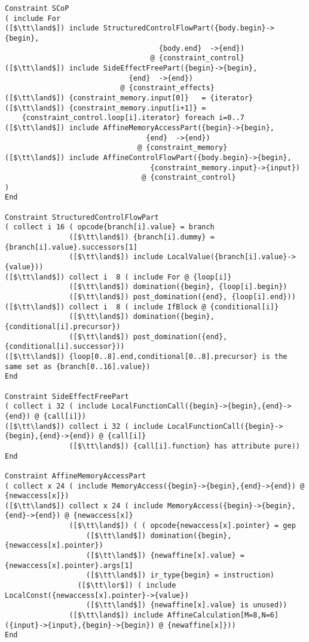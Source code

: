 \begin{lstlisting}[language=CAnDL]
Constraint SCoP
( include For
([$\tt\land$]) include StructuredControlFlowPart({body.begin}->{begin},
                                    {body.end}  ->{end})
                                  @ {constraint_control}
([$\tt\land$]) include SideEffectFreePart({begin}->{begin},
                             {end}  ->{end})
                           @ {constraint_effects}
([$\tt\land$]) {constraint_memory.input[0]}   = {iterator}
([$\tt\land$]) {constraint_memory.input[i+1]} =
    {constraint_control.loop[i].iterator} foreach i=0..7
([$\tt\land$]) include AffineMemoryAccessPart({begin}->{begin},
                                 {end}  ->{end})
                               @ {constraint_memory}
([$\tt\land$]) include AffineControlFlowPart({body.begin}->{begin},
                                  {constraint_memory.input}->{input})
                                @ {constraint_control}
)
End

Constraint StructuredControlFlowPart
( collect i 16 ( opcode{branch[i].value} = branch
               ([$\tt\land$]) {branch[i].dummy} = {branch[i].value}.successors[1]
               ([$\tt\land$]) include LocalValue({branch[i].value}->{value}))
([$\tt\land$]) collect i  8 ( include For @ {loop[i]}
               ([$\tt\land$]) domination({begin}, {loop[i].begin})
               ([$\tt\land$]) post_domination({end}, {loop[i].end}))
([$\tt\land$]) collect i  8 ( include IfBlock @ {conditional[i]}
               ([$\tt\land$]) domination({begin}, {conditional[i].precursor})
               ([$\tt\land$]) post_domination({end}, {conditional[i].successor}))
([$\tt\land$]) {loop[0..8].end,conditional[0..8].precursor} is the same set as {branch[0..16].value})
End

Constraint SideEffectFreePart
( collect i 32 ( include LocalFunctionCall({begin}->{begin},{end}->{end}) @ {call[i]}) 
([$\tt\land$]) collect i 32 ( include LocalFunctionCall({begin}->{begin},{end}->{end}) @ {call[i]}
               ([$\tt\land$]) {call[i].function} has attribute pure))
End

Constraint AffineMemoryAccessPart
( collect x 24 ( include MemoryAccess({begin}->{begin},{end}->{end}) @ {newaccess[x]})
([$\tt\land$]) collect x 24 ( include MemoryAccess({begin}->{begin},{end}->{end}) @ {newaccess[x]}
               ([$\tt\land$]) ( ( opcode{newaccess[x].pointer} = gep
                   ([$\tt\land$]) domination({begin}, {newaccess[x].pointer})
                   ([$\tt\land$]) {newaffine[x].value} = {newaccess[x].pointer}.args[1]
                   ([$\tt\land$]) ir_type{begin} = instruction)
                 ([$\tt\lor$]) ( include LocalConst({newaccess[x].pointer}->{value})
                   ([$\tt\land$]) {newaffine[x].value} is unused))
               ([$\tt\land$]) include AffineCalculation[M=8,N=6]({input}->{input},{begin}->{begin}) @ {newaffine[x]}))
End


\end{lstlisting}

